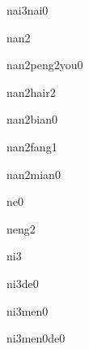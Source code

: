 \begin{multicols*}{2}
\begin{verbete}[奶奶]{nai3nai0}
\end{verbete}

\begin{verbete}[男]{nan2}
\end{verbete}

\begin{verbete}[男朋友]{nan2peng2you0}
\end{verbete}

\begin{verbete}[男孩儿]{nan2hair2}
\end{verbete}

\begin{verbete}[南边]{nan2bian0}
\end{verbete}

\begin{verbete}[南方]{nan2fang1}
\end{verbete}

\begin{verbete}[南面]{nan2mian0}
\end{verbete}

\begin{verbete}[呢]{ne0}
\end{verbete}

\begin{verbete}[能]{neng2}
\end{verbete}

\begin{verbete}[你]{ni3}
\end{verbete}

\begin{verbete}[你的]{ni3de0}
\end{verbete}

\begin{verbete}[你们]{ni3men0}
\end{verbete}

\begin{verbete}[你们的]{ni3men0de0}
\end{verbete}


\end{multicols*}
